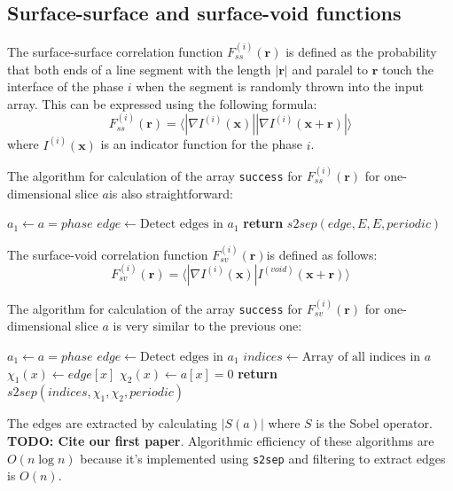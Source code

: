\documentclass[reprint,amsmath,amssymb,aps,pre,showkeys,showpacs,nofootinbib]{revtex4-1}
\newcommand{\code}[1]{\colorbox{light-gray}{\texttt{#1}}}
\begin{document}
\subsection{Surface-surface and surface-void functions}
The surface-surface correlation function $F_{ss}^{(i)}(\bm{r})$ is defined as
the probability that both ends of a line segment with the length $|\bm{r}|$ and
paralel to $\bm{r}$ touch the interface of the phase $i$ when the segment is
randomly thrown into the input array. This can be expressed using the following
formula:
\begin{equation*}
  F_{ss}^{(i)}(\bm{r}) = \langle |\nabla I^{(i)}(\bm{x})| |\nabla I^{(i)}(\bm{x}
  + \bm{r})| \rangle
\end{equation*}
where $I^{(i)}(\bm{x})$ is an indicator function for the phase $i$.

The algorithm for calculation of the array \code{success} for
$F_{ss}^{(i)}(\bm{r})$ for one-dimensional slice $a$is also straightforward:
\begin{algorithmic}[1]
    \State $a_1 \gets a = phase$
    \State $edge \gets \text{Detect edges in $a_1$}$
    \State \textbf{return} $s2sep(edge, E, E, periodic)$
  \EndProcedure
\end{algorithmic}

The surface-void correlation function $F_{sv}^{(i)}(\bm{r})$is defined as
follows:
\begin{equation*}
  F_{sv}^{(i)}(\bm{r}) = \langle |\nabla I^{(i)}(\bm{x})| I^{(void)}(\bm{x}
  + \bm{r}) \rangle
\end{equation*}

The algorithm for calculation of the array \code{success} for
$F_{sv}^{(i)}(\bm{r})$ for one-dimensional slice $a$ is very similar to the
previous one:
\begin{algorithmic}[1]
    \State $a_1 \gets a = phase$
    \State $edge \gets \text{Detect edges in $a_1$}$
    \State $indices \gets \text{Array of all indices in $a$}$
    \State $\chi_1(x) \gets edge[x]$
    \State $\chi_2(x) \gets a[x] = 0$ 
    \State \textbf{return} $s2sep(indices, \chi_1, \chi_2, periodic)$
  \EndProcedure
\end{algorithmic}

The edges are extracted by calculating $|S(a)|$ where $S$ is the Sobel
operator. \textbf{TODO: Cite our first paper}. Algorithmic efficiency of these
algorithms are $O(n\log n)$ because it's implemented using \code{s2sep} and
filtering to extract edges is $O(n)$.
\end{document}
